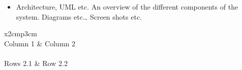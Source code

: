 \begin{itemize}
\item Architecture, UML etc. An overview of the different components of the system. Diagrams etc… Screen shots etc.
\end{itemize}

\begin{table}[h]
  \centering
  \begin{tabular}{x{2cm}p{3cm}}
    \toprule \\
    Column 1 & Column 2 \\
    \midrule \\
    Rows 2.1 & Row 2.2 \\
    \bottomrule
  \end{tabular}
  \caption{A table.}
  \label{table:mytable}
\end{table}
